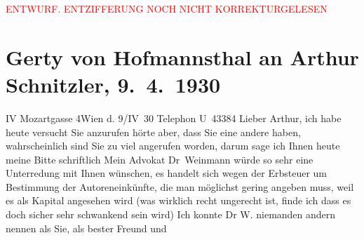 
\begin{center}
            \textcolor{red}{ENTWURF. ENTZIFFERUNG NOCH NICHT KORREKTURGELESEN}
                      \end{center}
            
               \section[Gerty von Hofmannsthal an Arthur Schnitzler, 9. 4. 1930]{ Gerty von Hofmannsthal an Arthur Schnitzler, 9. 4. 1930}\nopagebreak{}\rehead{ }\begin{ledgroupsized}[t]{13cm}\normalsize\beginnumbering{} \toendnotes[C]{\smallbreak\pagebreak[2]} 
\toendnotes[C]{\smallbreak}\pstart
           \noindent{}{\pb}IV Mozartgasse 4\hfill Wien d. 9/IV 30\pend
           \pstart
           Telephon U 43384\pend
           \pstart
           Lieber Arthur, ich habe heute versucht Sie anzurufen hörte
                    aber, dass Sie eine andere \label{K_L02535_1v}\label{K_L02535_1h} haben, wahrscheinlich sind Sie zu viel angerufen worden, darum sage ich
                    Ihnen heute meine Bitte schriftlich\pend
           \pstart
           Mein Advokat Dr Weinmann würde so sehr eine
                    Unterredung mit Ihnen wünschen, es handelt sich wegen der Erbsteuer um
                    Bestimmung der Autoreneinkünfte, die man möglichst gering angeben muss, weil es
                    als Kapital angesehen wird (was wirklich recht ungerecht ist, finde ich dass es
                    doch sicher sehr schwankend sein wird) Ich konnte Dr W. niemanden andern nennen als Sie, als bester Freund und

\end{ledgroupsized}
